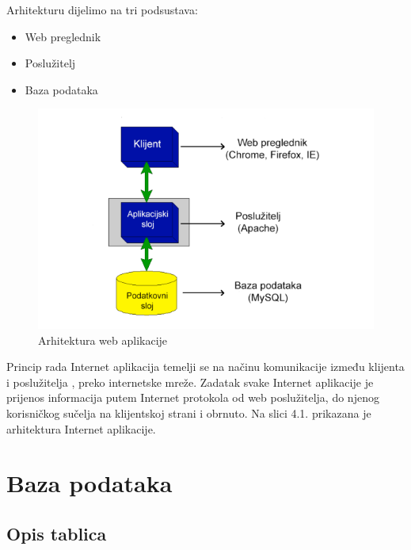 		
			 Arhitekturu dijelimo na tri podsustava:
		\begin{itemize}
			\item 	Web preglednik
			\item 	Poslužitelj
			\item 	Baza podataka	
		\end{itemize}

		\begin{figure}[H]
			
			\includegraphics[width=\textwidth]{slike/webAplikacija.png} %
			\centering
			\caption{Arhitektura web aplikacije}
			\label{fig:registrirani432132}
		\end{figure}
	
		Princip rada Internet aplikacija temelji se na načinu komunikacije između klijenta i poslužitelja , preko internetske mreže. Zadatak svake Internet aplikacije je prijenos informacija 
		putem Internet protokola od web poslužitelja, do njenog korisničkog sučelja na klijentskoj strani i 
		obrnuto. Na slici 4.1. prikazana je arhitektura Internet aplikacije.

		

			\eject
		\section{Baza podataka}
			
			

			
			
		
		
			\subsection{Opis tablica}
			

